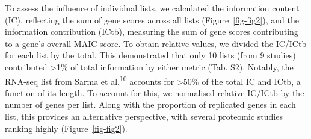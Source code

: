 \documentclass[
  11,
  a4paper,
]{article}
\begin{document}
To assess the influence of individual lists, we calculated the
information content (IC), reflecting the sum of gene scores across all
lists (Figure~\ref{fig-fig2}), and the information contribution (ICtb),
measuring the sum of gene scores contributing to a gene's overall MAIC
score. To obtain relative values, we divided the IC/ICtb for each list
by the total. This demonstrated that only 10 lists (from 9 studies)
contributed \textgreater1\% of total information by either metric (Tab.
S2). Notably, the RNA-seq list from Sarma et al.\textsuperscript{10}
accounts for \textgreater50\% of the total IC and ICtb, a function of
its length. To account for this, we normalised relative IC/ICtb by the
number of genes per list. Along with the proportion of replicated genes
in each list, this provides an alternative perspective, with several
proteomic studies ranking highly (Figure~\ref{fig-fig2}).
\end{document}
